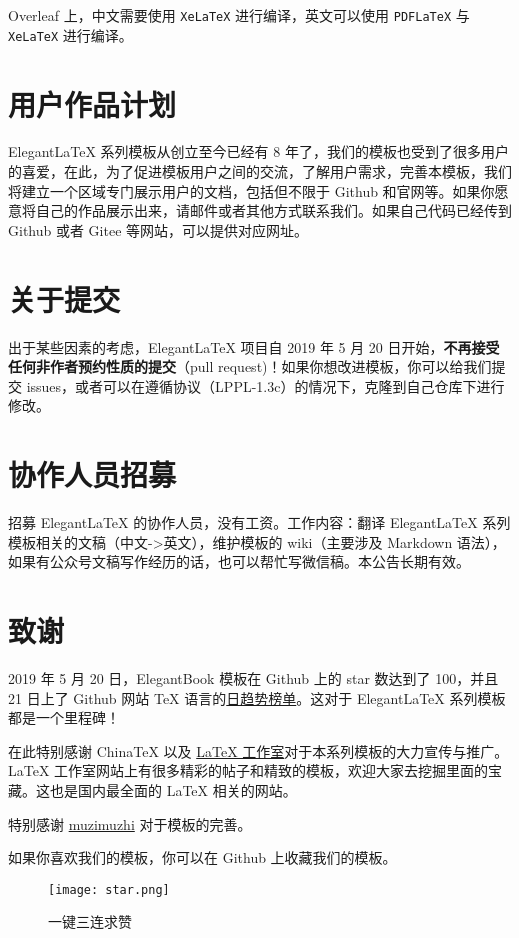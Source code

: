 \documentclass[cn,11pt]{elegantbook}
\begin{document}
\begin{remark}
Overleaf 上，中文需要使用 \lstinline{XeLaTeX} 进行编译，英文可以使用 \lstinline{PDFLaTeX} 与 \lstinline{XeLaTeX} 进行编译。
\end{remark}

\section{用户作品计划}
Elegant\LaTeX{} 系列模板从创立至今已经有 8 年了，我们的模板也受到了很多用户的喜爱，在此，为了促进模板用户之间的交流，了解用户需求，完善本模板，我们将建立一个区域专门展示用户的文档，包括但不限于 Github 和官网等。如果你愿意将自己的作品展示出来，请邮件或者其他方式联系我们。如果自己代码已经传到 Github 或者 Gitee 等网站，可以提供对应网址。

\section{关于提交}
出于某些因素的考虑，Elegant\LaTeX{} 项目自 2019 年 5 月 20 日开始，\textbf{不再接受任何非作者预约性质的提交}（pull request)！如果你想改进模板，你可以给我们提交 issues，或者可以在遵循协议（LPPL-1.3c）的情况下，克隆到自己仓库下进行修改。

\section{协作人员招募}
招募 Elegant\LaTeX{} 的协作人员，没有工资。工作内容：翻译 Elegant\LaTeX{} 系列模板相关的文稿（中文->英文），维护模板的 wiki（主要涉及 Markdown 语法），如果有公众号文稿写作经历的话，也可以帮忙写微信稿。本公告长期有效。

\section{致谢}
2019 年 5 月 20 日，ElegantBook 模板在 Github 上的 star 数达到了 100，并且 21 日上了 Github 网站 \TeX{} 语言的\href{https://github.com/trending/tex?since=daily}{日趋势榜单}。这对于 Elegant\LaTeX{} 系列模板都是一个里程碑！

在此特别感谢 China\TeX{} 以及 \href{http://www.latexstudio.net/}{\LaTeX{} 工作室}对于本系列模板的大力宣传与推广。\LaTeX{} 工作室网站上有很多精彩的帖子和精致的模板，欢迎大家去挖掘里面的宝藏。这也是国内最全面的 \LaTeX{} 相关的网站。

特别感谢 \href{https://github.com/muzimuzhi}{muzimuzhi} 对于模板的完善。

如果你喜欢我们的模板，你可以在 Github 上收藏我们的模板。
\begin{figure}[htbp]
\centering
\texttt{[image: star.png]}
\caption{一键三连求赞}
\end{figure}
\end{document}

